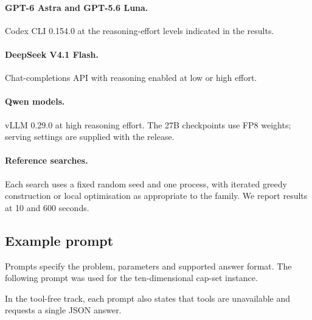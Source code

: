 \paragraph{GPT-6 Astra and GPT-5.6 Luna.} Codex CLI 0.154.0 at the reasoning-effort levels indicated in the results.
\paragraph{DeepSeek V4.1 Flash.} Chat-completions API with reasoning enabled at low or high effort.
\paragraph{Qwen models.} vLLM 0.29.0 at high reasoning effort. The 27B checkpoints use FP8 weights; serving settings are supplied with the release.
\paragraph{Reference searches.} Each search uses a fixed random seed and one process, with iterated greedy construction or local optimisation as appropriate to the family. We report results at 10 and 600 seconds.
\subsection{Example prompt}
\label{app:prompt}
Prompts specify the problem, parameters and supported answer format. The following prompt was used for the ten-dimensional cap-set instance.
\begin{taskbox}[title=Model prompt]

\end{taskbox}
In the tool-free track, each prompt also states that tools are unavailable and requests a single JSON answer.
